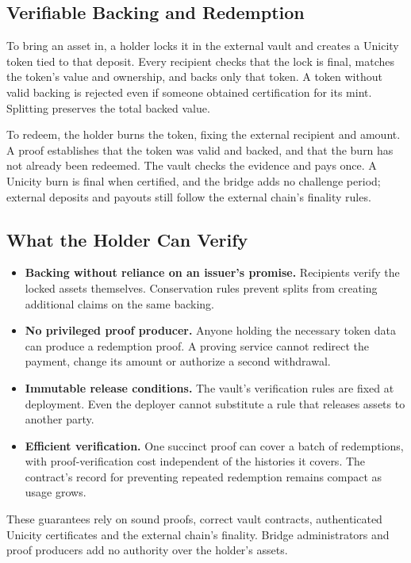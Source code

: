 \subsection{Verifiable Backing and Redemption}\label{sec:bridge-in}

To bring an asset in, a holder locks it in the external vault and creates a Unicity token tied to that deposit. Every recipient checks that the lock is final, matches the token's value and ownership, and backs only that token. A token without valid backing is rejected even if someone obtained certification for its mint. Splitting preserves the total backed value.

To redeem, the holder burns the token, fixing the external recipient and amount. A proof establishes that the token was valid and backed, and that the burn has not already been redeemed. The vault checks the evidence and pays once. A Unicity burn is final when certified, and the bridge adds no challenge period; external deposits and payouts still follow the external chain's finality rules.

\subsection{What the Holder Can Verify}

\begin{itemize}
    \item \textbf{Backing without reliance on an issuer's promise.} Recipients verify the locked assets themselves. Conservation rules prevent splits from creating additional claims on the same backing.
    \item \textbf{No privileged proof producer.} Anyone holding the necessary token data can produce a redemption proof. A proving service cannot redirect the payment, change its amount or authorize a second withdrawal.
    \item \textbf{Immutable release conditions.} The vault's verification rules are fixed at deployment. Even the deployer cannot substitute a rule that releases assets to another party.
    \item \textbf{Efficient verification.} One succinct proof can cover a batch of redemptions, with proof-verification cost independent of the histories it covers. The contract's record for preventing repeated redemption remains compact as usage grows.
\end{itemize}

These guarantees rely on sound proofs, correct vault contracts, authenticated Unicity certificates and the external chain's finality. Bridge administrators and proof producers add no authority over the holder's assets.

